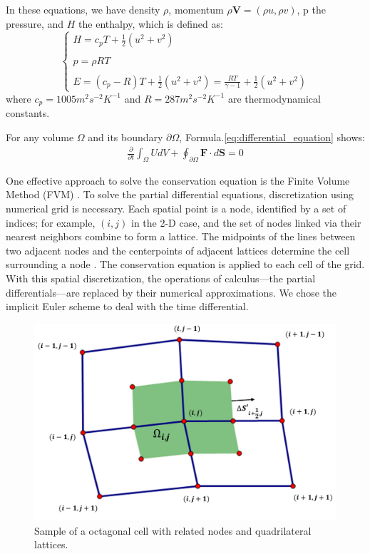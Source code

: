 \documentclass[%
 reprint,
 amsmath,amssymb,
pra,
]{revtex4-1}
\begin{document}
In these equations, we have density $\rho$, momentum $\rho\bm{V}=\left(\rho u, \rho v\right)$, p the pressure, and $H$ the enthalpy, which is defined as:
\begin{equation}
\left\{
\begin{array}{l}
	H =  c_p T + \frac{1}{2}\left(u^2 + v^2\right)\\
	\\
	p =  \rho R T\\
	\\
	E = \left(c_p - R\right) T + \frac{1}{2}\left(u^2 + v^2\right) = \frac{R T}{\gamma - 1} + \frac{1}{2}\left(u^2 + v^2\right)
\end{array}
\right.
\end{equation}
where $c_p = 1005 m^2 s^{-2} K^{-1}$ and $R = 287 m^2 s^{-2} K^{-1}$ are thermodynamical constants.

For any volume $\Omega$ and its boundary $\partial\Omega$, Formula.\ref{eq:differential_equation} shows:
\begin{align}\label{eq:integral_equation}
	\frac{\partial}{\partial t}\int_\Omega U d V + \oint_{\partial \Omega} \bm{F} \cdot d \bm{S} = 0
\end{align}

One effective approach to solve the conservation equation is the Finite Volume Method (FVM) \cite{eymard2000finite}.
 To solve the partial differential equations, discretization using numerical grid is necessary. Each spatial point is a node, identified by a set of indices; for example, $\left(i, j\right)$ in the 2-D case, and the set of nodes linked via their nearest neighbors combine to form a lattice. The midpoints of the lines between two adjacent nodes and the centerpoints of adjacent lattices determine the cell surrounding a node \cite{economon2016su2}. The conservation equation is applied to each cell of the grid. With this spatial discretization, the operations of calculus—the partial differentials—are replaced by their numerical approximations. We chose the implicit Euler scheme to deal with the time differential.

\begin{figure}[h]
	\centering  
	\includegraphics[width=0.7\linewidth]{Fig/grid}
	\caption{Sample of a octagonal cell with related nodes and quadrilateral lattices.}
	\label{fig:sample_of_cell}
\end{figure}
\end{document}
